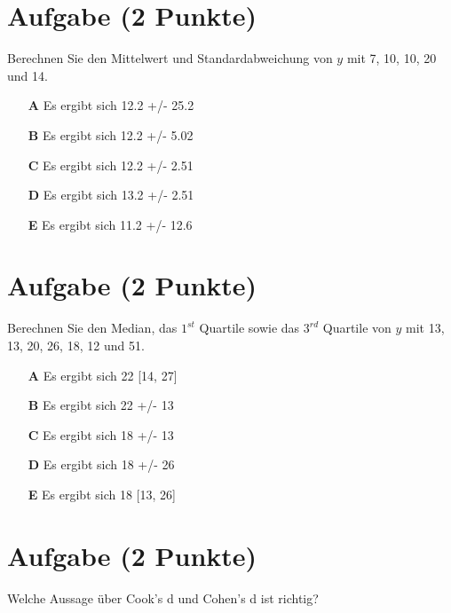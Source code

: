 \documentclass[a4paper, 10pt]{scrartcl}\usepackage[]{graphicx}\usepackage[]{xcolor}
\begin{document}
\section{Aufgabe \hfill (2 Punkte)}




Berechnen Sie den Mittelwert und Standardabweichung von $y$ mit 7, 10, 10, 20 und 14.



\begin{enumerate}
\item [\textbf{A} \msquare] Es ergibt sich 12.2 +/- 25.2
\item [\textbf{B} \msquare] Es ergibt sich 12.2 +/- 5.02
\item [\textbf{C} \msquare] Es ergibt sich 12.2 +/- 2.51
\item [\textbf{D} \msquare] Es ergibt sich 13.2 +/- 2.51
\item [\textbf{E} \msquare] Es ergibt sich 11.2 +/- 12.6
\end{enumerate} 

\section{Aufgabe \hfill (2 Punkte)}




Berechnen Sie den Median, das $1^{st}$ Quartile sowie das $3^{rd}$ Quartile von $y$ mit 13, 13, 20, 26, 18, 12 und 51.



\begin{enumerate}
\item [\textbf{A} \msquare] Es ergibt sich 22 [14, 27]
\item [\textbf{B} \msquare] Es ergibt sich 22 +/- 13
\item [\textbf{C} \msquare] Es ergibt sich 18 +/- 13
\item [\textbf{D} \msquare] Es ergibt sich 18 +/- 26
\item [\textbf{E} \msquare] Es ergibt sich 18 [13, 26]
\end{enumerate} 

\section{Aufgabe \hfill (2 Punkte)}

Welche Aussage {\"u}ber Cook's d und Cohen's d ist richtig? 
\end{document}
